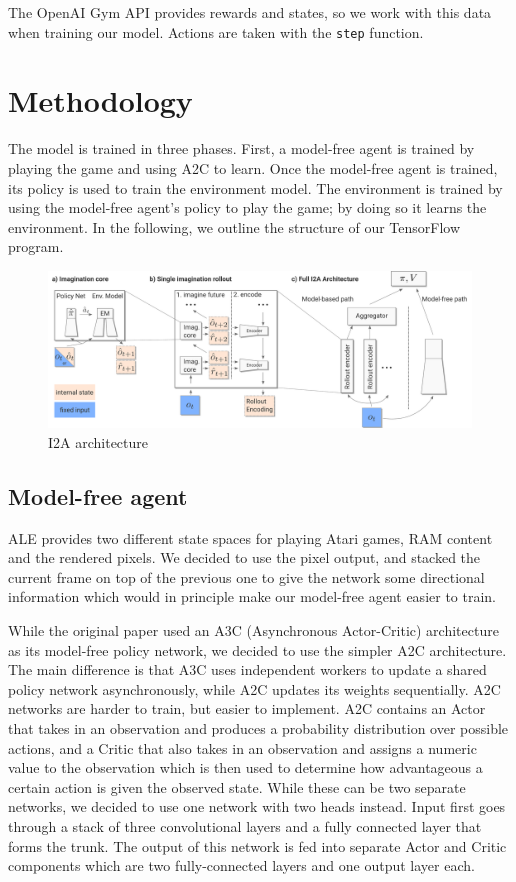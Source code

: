 \documentclass[10pt, twocolumn]{article}
\begin{document}
The OpenAI Gym API provides rewards and states, so we work with this data when training our model.
Actions are taken with the \verb|step| function.

\section{Methodology}

The model is trained in three phases. First, a model-free agent is trained by playing the game and using
A2C to learn. Once the model-free agent is trained, its policy is used to train the environment model.
The environment is trained by using the model-free agent's policy to play the game; by doing so it learns the
environment. In the following, we outline the structure of our TensorFlow program.

\begin{figure}
\centering
\includegraphics[scale=0.3]{i2a}
\caption{I2A architecture}
\label{I2A}
\end{figure}

\subsection{Model-free agent}
ALE provides two different state spaces for playing Atari games, RAM content and the rendered pixels. We decided to use the pixel output, and stacked the current frame on top of the previous one to give the network some directional information which would in principle make our model-free agent easier to train.

While the original paper used an A3C (Asynchronous Actor-Critic) architecture as its model-free policy network, we decided to use the simpler A2C architecture.
The main difference is that A3C uses independent workers to update a shared policy network asynchronously, while A2C updates its weights sequentially.
A2C networks are harder to train, but easier to implement.
A2C contains an Actor that takes in an observation and produces a probability distribution over possible actions, and a Critic that also takes in an observation and assigns a numeric value to the observation which is then used to determine how advantageous a certain action is given the observed state.
While these can be two separate networks, we decided to use one network with two heads instead.
Input first goes through a stack of three convolutional layers and a fully connected layer that forms the trunk.
The output of this network is fed into separate Actor and Critic components which are two fully-connected layers and one output layer each.
\end{document}

